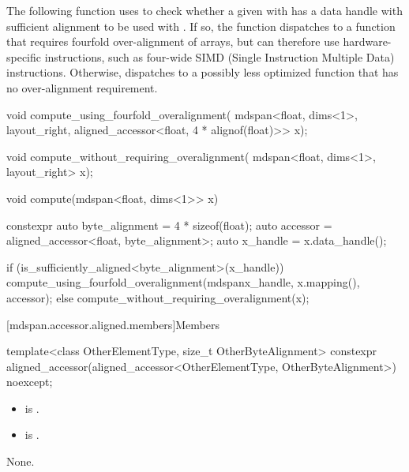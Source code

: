 \pnum
\begin{example}
The following function 
uses  to check
whether a given  with  has
a data handle with sufficient alignment
to be used with .
If so, the function dispatches to
a function 
that requires fourfold over-alignment of arrays,
but can therefore use hardware-specific instructions,
such as four-wide SIMD (Single Instruction Multiple Data) instructions.
Otherwise,  dispatches to a
possibly less optimized function 
that has no over-alignment requirement.
\begin{codeblock}
void compute_using_fourfold_overalignment(
  mdspan<float, dims<1>, layout_right, aligned_accessor<float, 4 * alignof(float)>> x);

void compute_without_requiring_overalignment(
  mdspan<float, dims<1>, layout_right> x);

void compute(mdspan<float, dims<1>> x) {
  constexpr auto byte_alignment = 4 * sizeof(float);
  auto accessor = aligned_accessor<float, byte_alignment>{};
  auto x_handle = x.data_handle();

  if (is_sufficiently_aligned<byte_alignment>(x_handle)) {
    compute_using_fourfold_overalignment(mdspan{x_handle, x.mapping(), accessor});
  } else {
    compute_without_requiring_overalignment(x);
  }
}
\end{codeblock}
\end{example}

[mdspan.accessor.aligned.members]{Members}

%
\begin{itemdecl}
template<class OtherElementType, size_t OtherByteAlignment>
  constexpr aligned_accessor(aligned_accessor<OtherElementType, OtherByteAlignment>) noexcept;
\end{itemdecl}

\begin{itemdescr}
\pnum
\constraints
\begin{itemize}
\item
{}
is .
\item
{} is .
\end{itemize}

\pnum
\effects
None.
\end{itemdescr}


